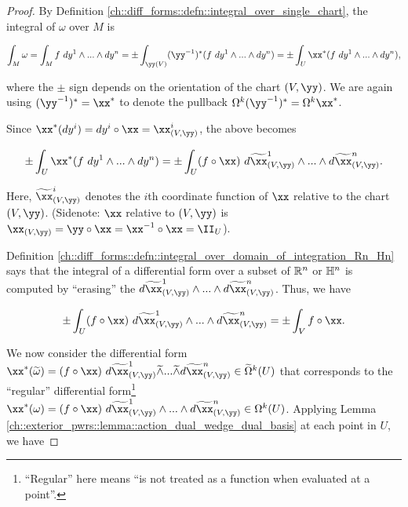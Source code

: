 \begin{proof}
    By Definition \ref{ch::diff_forms::defn::integral_over_single_chart}, the integral of $\omega$ over $M$ is

    \begin{align*}
        \int_M \omega = \int_M f \spc dy^1 \wedge ... \wedge dy^n = \pm \int_{\yy(V)} (\yy^{-1})^*(f \spc dy^1 \wedge ... \wedge dy^n) = \pm \int_U \xx^*(f \spc dy^1 \wedge ... \wedge dy^n),
    \end{align*}
    
    where the $\pm$ sign depends on the orientation of the chart $(V, \yy)$. We are again using $(\yy^{-1})^* = \xx^*$ to denote the pullback $\Omega^k (\yy^{-1})^* = \Omega^k \xx^*$.
    
    Since $\xx^*(dy^i) = dy^i \circ \xx = \xx_{(V, \yy)}^i$, the above becomes
    
    \begin{align*}
        \pm \int_U \xx^*(f \spc dy^1 \wedge ... \wedge dy^n) = \pm \int_U (f \circ \xx) \spc d\tx_{(V, \yy)}^1 \wedge ... \wedge d\tx_{(V, \yy)}^n.
    \end{align*}
    
    Here, $\tx_{(V, \yy)}^i$ denotes the $i$th coordinate function of $\xx$ relative to the chart $(V, \yy)$. (Sidenote: $\xx$ relative to $(V, \yy)$ is $\xx_{(V, \yy)} = \yy \circ \xx = \xx^{-1} \circ \xx = \II_U$).
    
    Definition \ref{ch::diff_forms::defn::integral_over_domain_of_integration_Rn_Hn} says that the integral of a differential form over a subset of $\mathbb{R}^n$ or $\mathbb{H}^n$ is computed by ``erasing'' the $d\tx_{(V, \yy)}^1 \wedge ... \wedge d\tx_{(V, \yy)}^n$. Thus, we have
    
    \begin{align*}
        \pm \int_U (f \circ \xx) \spc d\tx_{(V, \yy)}^1 \wedge ... \wedge d\tx_{(V, \yy)}^n = \pm \int_V f \circ \xx.
    \end{align*}

    We now consider the differential form $\xx^*(\tomega) = (f \circ \xx) \spc d\tx_{(V, \yy)}^1 \twedge ... \twedge d\tx_{(V, \yy)}^n \in \tOmega^k(U)$ that corresponds to the ``regular'' differential form\footnote{``Regular'' here means ``is not treated as a function when evaluated at a point''.} $\xx^*(\omega) = (f \circ \xx) \spc d\tx_{(V, \yy)}^1 \wedge ... \wedge d\tx_{(V, \yy)}^n \in \Omega^k(U)$. Applying Lemma \ref{ch::exterior_pwrs::lemma::action_dual_wedge_dual_basis} at each point in $U$, we have
    

\end{proof}
